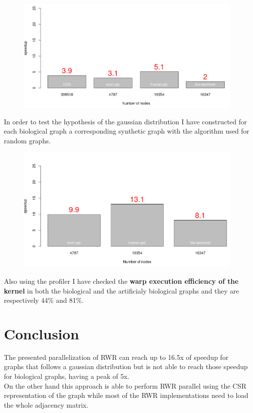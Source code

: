 \documentclass[a4paper]{article}
\begin{document}
\begin{figure}[H]
    \centering
    \includegraphics[width=\textwidth]{img/2020-07-13-00:54:48.png}
\end{figure}

In order to test the hypothesis of the gaussian distribution I have constructed
for each biological graph a corresponding synthetic graph with the algorithm
used for random graphs.
\begin{figure}[H]
    \centering
    \includegraphics[width=\textwidth]{img/2020-07-13-01:51:52.png}
\end{figure}

Also using the profiler  I have checked the \textbf{warp execution
efficiency of the kernel} in both the biological and the artificialy biological
graphs and they are respectively 44\% and 81\%.


\section{Conclusion}
The presented parallelization of RWR can reach up to 16.5x of
speedup for graphs that follows a gaussian distribution 
but is not able to reach those speedup for biological graphs, having a peak of
5x.\\
On the other hand this approach is able to perform RWR parallel using the CSR
representation of the graph while most of the RWR implementations need to load
the whole adjacency matrix.
\end{document}
